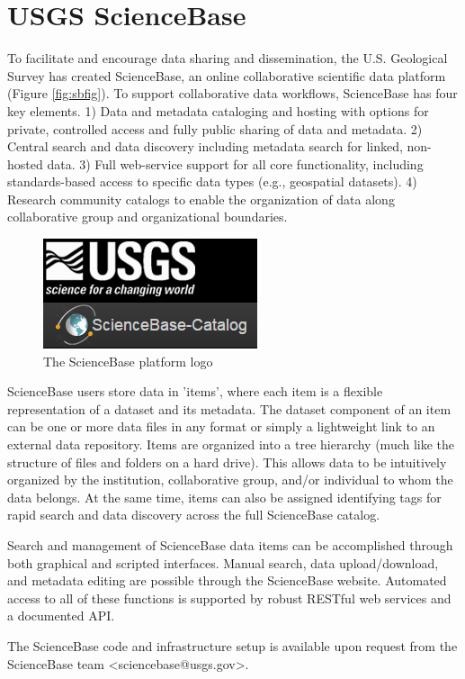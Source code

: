 \section{USGS ScienceBase}

To facilitate and encourage data sharing and dissemination,
the U.S. Geological Survey has created ScienceBase, an online
collaborative scientific data platform (Figure \ref{fig:sbfig}). To support collaborative
data workflows, ScienceBase has four key elements. 1) Data and metadata
cataloging and hosting with options for private, controlled access
and fully public sharing of data and metadata. 2) Central search and
data discovery including metadata search for linked, non-hosted data.
3) Full web-service support for all core functionality, including
standards-based access to specific data types (e.g., geospatial
datasets). 4) Research community catalogs to
enable the organization of data along collaborative group and
organizational boundaries.

 \begin{figure}[htbp]
   \centering
   \includegraphics{sblogo}
   \caption{The ScienceBase platform logo}
   \label{figure:sbfig}
 \end{figure}

ScienceBase users store data in 'items', where each item is a flexible
representation of a dataset and its metadata. The dataset component of an
item can be one or more data files in any format or simply a lightweight
link to an external data repository.
Items are organized into a tree hierarchy (much like the structure of files and
folders on a hard drive). This allows data to be intuitively organized by the
institution, collaborative group, and/or individual to whom
the data belongs. At the same time, items can also be assigned identifying tags
for rapid search and data discovery across the full ScienceBase catalog.

Search and management of ScienceBase data items can be accomplished through
both graphical and scripted interfaces. Manual search, data upload/download, and
metadata editing are possible through the ScienceBase website.
Automated access to all of these functions is supported by robust RESTful web
services and a documented API.

The ScienceBase code and infrastructure setup is available upon
request from the ScienceBase team <sciencebase@usgs.gov>.
